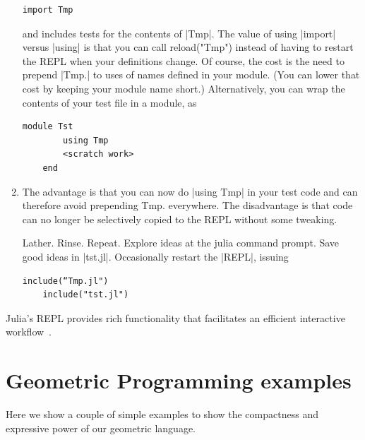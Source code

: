 \begin{script}
\begin{enumerate}
\begin{lstlisting}[language=JuliaLocal, style=julia, mathescape = true]
    import Tmp
\end{lstlisting}

    and includes tests for the contents of |Tmp|. The value of using |import| versus |using| is that you can call reload("Tmp") instead of having to restart the REPL when your definitions change. Of course, the cost is the need to prepend |Tmp.| to uses of names defined in your module. (You can lower that cost by keeping your module name short.)
    Alternatively, you can wrap the contents of your test file in a module, as

\begin{lstlisting}[language=JuliaLocal, style=julia, mathescape = true]
    module Tst
        using Tmp
        <scratch work>
    end
\end{lstlisting}

\item 
    The advantage is that you can now do |using Tmp| in your test code and can therefore avoid prepending Tmp. everywhere. The disadvantage is that code can no longer be selectively copied to the REPL without some tweaking.

    Lather. Rinse. Repeat. Explore ideas at the julia command prompt. Save good ideas in |tst.jl|. Occasionally restart the |REPL|, issuing

\begin{lstlisting}[language=JuliaLocal, style=julia, mathescape = true]
    include(“Tmp.jl")
    include("tst.jl")
\end{lstlisting}
\end{enumerate}


Julia's REPL provides rich functionality that facilitates an efficient interactive workflow~\cite{}. 


    
    

\section{Geometric Programming examples}\label{sect:2-6}

Here we show a couple of simple examples to show the compactness and expressive power of our geometric language.

\begin{coding} 
\label{example:1:Manhattan2D}


\end{coding}
\end{script}
